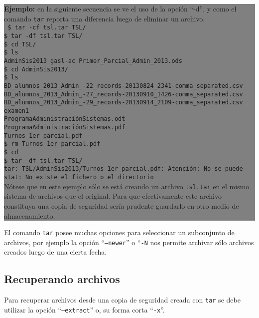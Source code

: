 \documentclass[12pt]{article}
\begin{document}
\colorbox{grey}{\parbox[t]{0.95\linewidth}{ \vspace*{0.5cm} { 
{\bf Ejemplo:} en la siguiente secuencia se ve el uso de la opción ``-d'',
y como el comando \texttt{tar} reporta una diferencia luego de eliminar 
un archivo.\\ 
{\tt
\$ tar -cf tsl.tar TSL/\\
\$ tar -df tsl.tar TSL/\\
\$ cd TSL/\\
\$ ls\\
AdminSis2013  gasl-ac  Primer\_Parcial\_Admin\_2013.ods\\
\$ cd AdminSis2013/\\
\$ ls\\
BD\_alumnos\_2013\_Admin\_-22\_records-20130824\_2341-comma\_separated.csv\\
BD\_alumnos\_2013\_Admin\_-27\_records-20130910\_1426-comma\_separated.csv\\
BD\_alumnos\_2013\_Admin\_-29\_records-20130914\_2109-comma\_separated.csv\\
examen1\\
ProgramaAdministraciónSistemas.odt\\
ProgramaAdministraciónSistemas.pdf\\
Turnos\_1er\_parcial.pdf\\
\$ rm Turnos\_1er\_parcial.pdf \\
\$ cd \\
\$ tar -df tsl.tar TSL/\\
tar: TSL/AdminSis2013/Turnos\_1er\_parcial.pdf: Atención: No se puede stat:
No existe el fichero o el directorio\\
}
Nótese que en este ejemplo sólo se está creando un  archivo {\tt tsl.tar} 
en el mismo sistema de archivos que el original. Para que efectivamente 
este archivo constituya una copia de seguridad sería prudente guardarlo 
en otro medio de almacenamiento. 
} \vspace*{0.5cm} } } 

El comando {\tt tar} posee muchas opciones para seleccionar un subconjunto
de archivos, por ejemplo la opción ``{\tt --newer}'' o ``{\tt -N} nos 
permite archivar sólo archivos creados luego de una cierta fecha.  

\subsection*{Recuperando archivos }

Para recuperar archivos desde una copia de seguridad creada con {\tt tar} se
debe utilizar la opción ``{\tt --extract}'' o, su forma corta ``{\tt -x}''. 
\end{document}
